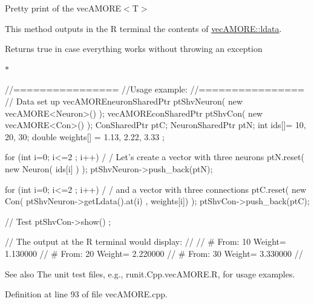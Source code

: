Pretty print of the vecAMORE$<$T$>$ 

This method outputs in the R terminal the contents of \hyperlink{classvec_a_m_o_r_e_a1aa2ee42627e14994fed21bc6446993d}{vecAMORE::ldata}. \begin{DoxyReturn}{Returns}
true in case everything works without throwing an exception
\end{DoxyReturn}
$\ast$ 
\begin{DoxyCode}
                //================
                //Usage example:
                //================
                // Data set up
                        vecAMOREneuronSharedPtr ptShvNeuron( new 
      vecAMORE<Neuron>() );
                        vecAMOREconSharedPtr    ptShvCon( new vecAMORE<Con>() );
                        ConSharedPtr    ptC;
                        NeuronSharedPtr ptN;
                        int ids[]= {10, 20, 30};
                        double weights[] = {1.13, 2.22, 3.33 };

                        for (int i=0; i<=2 ; i++) {                             /
      / Let's create a vector with three neurons
                                ptN.reset( new Neuron( ids[i] ) );
                                ptShvNeuron->push_back(ptN);
                        }

                        for (int i=0; i<=2 ; i++) {                             /
      / and a vector with three connections
                                ptC.reset( new Con( ptShvNeuron->getLdata().at(i)
      , weights[i]) );
                                ptShvCon->push_back(ptC);
                        }

                // Test
                        ptShvCon->show() ;

                // The output at the R terminal would display:
                //
                //      # From:  10      Weight=         1.130000
                //      # From:  20      Weight=         2.220000
                //      # From:  30      Weight=         3.330000
                //
\end{DoxyCode}


\begin{DoxySeeAlso}{See also}
The unit test files, e.g., runit.Cpp.vecAMORE.R, for usage examples. 
\end{DoxySeeAlso}


Definition at line 93 of file vecAMORE.cpp.


